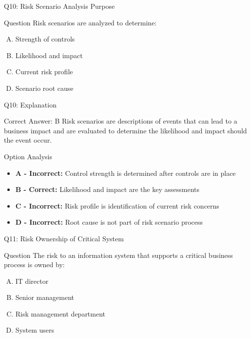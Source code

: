 \documentclass{beamer}
\begin{document}
	
	\begin{frame}{Q10: Risk Scenario Analysis Purpose}
		\begin{block}{Question}
			Risk scenarios are analyzed to determine:
		\end{block}
		\begin{enumerate}[(A)]
			\item Strength of controls
			\item Likelihood and impact
			\item Current risk profile
			\item Scenario root cause
		\end{enumerate}
	\end{frame}
	
	\begin{frame}{Q10: Explanation}
		\begin{block}{Correct Answer: B}
			Risk scenarios are descriptions of events that can lead to a business impact and are evaluated to determine the likelihood and impact should the event occur.
		\end{block}
		\begin{block}{Option Analysis}
			\begin{itemize}
				\item \textbf{A - Incorrect:} Control strength is determined after controls are in place
				\item \textbf{B - Correct:} Likelihood and impact are the key assessments
				\item \textbf{C - Incorrect:} Risk profile is identification of current risk concerns
				\item \textbf{D - Incorrect:} Root cause is not part of risk scenario process
			\end{itemize}
		\end{block}
	\end{frame}
	
	\begin{frame}{Q11: Risk Ownership of Critical System}
		\begin{block}{Question}
			The risk to an information system that supports a critical business process is owned by:
		\end{block}
		\begin{enumerate}[(A)]
			\item IT director
			\item Senior management
			\item Risk management department
			\item System users
		\end{enumerate}
	\end{frame}
	
\end{document}
